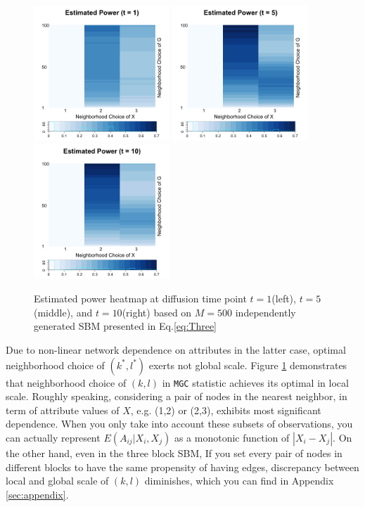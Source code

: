 \documentclass[12pt]{article}
\theoremstyle{definition}
\begin{document}
\begin{figure}[H]
	\centering
	\includegraphics[width=2in]{../Figure/ThreeSBM_power1.png}
	\includegraphics[width=2in]{../Figure/ThreeSBM_power5.png}
	\includegraphics[width=2in]{../Figure/ThreeSBM_power10.png}
	\caption{Estimated power heatmap at diffusion time point $t=1$(left), $t=5$(middle), and $t=10$(right) based on $M = 500$ independently generated SBM presented in Eq.\ref{eq:Three}}
	\label{fig:ThreeSBM_power}
\end{figure}
Due to non-linear network dependence on attributes in the latter case, optimal neighborhood choice of $(k^{*}, l^{*})$ exerts not global scale.  Figure \ref{fig:ThreeSBM_power} demonstrates that neighborhood choice of $(k,l)$ in \texttt{MGC} statistic achieves its optimal in local scale. Roughly speaking, considering a pair of nodes in the nearest neighbor, in term of attribute values of $X$, e.g. (1,2) or (2,3), exhibits most significant dependence. When you only take into account these subsets of observations, you can actually represent $E(A_{ij} | X_{i}, X_{j})$ as a monotonic function of $|X_{i} - X_{j}|$. On the other hand, even in the three block SBM, If you set every pair of nodes in different blocks to have the same propensity of having edges, discrepancy between local and global scale of $(k,l)$ diminishes, which you can find in Appendix \ref{sec:appendix}.
\end{document}
